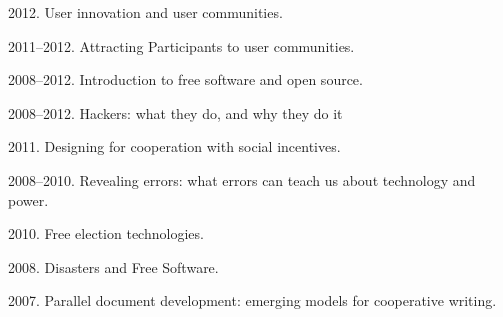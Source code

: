 \documentclass[11pt]{article}
\newenvironment{cvlist}{
\begin{list}{}{\leftmargin=3.0em \itemindent=-3.0em}
  \setlength{\itemsep}{0pt}
  \setlength{\parskip}{0em}
  \setlength{\parsep}{1em}
  \setlength{\parindent}{0em}}
{\vspace{1em}
\end{list}}
\begin{document}
\begin{cvlist}

\item 2012. User innovation and user communities.
\item 2011--2012. Attracting Participants to user communities.
\item 2008--2012. Introduction to free software and open source.
\item 2008--2012. Hackers: what they do, and why they do it
\item 2011. Designing for cooperation with social incentives.
\item 2008--2010. Revealing errors: what errors can teach us about technology and power.
\item 2010. Free election technologies.
\item 2008. Disasters and Free Software.
\item 2007. Parallel document development: emerging models for
  cooperative writing.






\end{cvlist}
\end{document}
